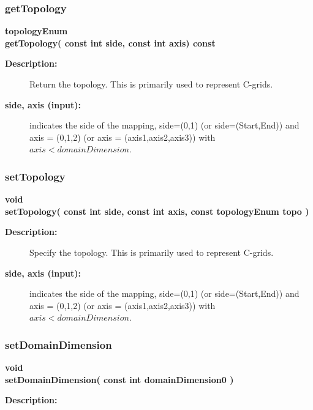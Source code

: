 \subsubsection{getTopology}
 
\begin{flushleft} \textbf{%
topologyEnum  \\ 
\settowidth{\MappingIncludeArgIndent}{getTopology(}%
getTopology( const int side, const int axis) const
}\end{flushleft}
\begin{description}
\item[{\bf Description:}] 
     Return the topology. This is primarily used to represent C-grids.
\item[{\bf side, axis (input):}]  indicates the side of the mapping, side=(0,1) (or side=(Start,End)) 
     and axis = (0,1,2) (or axis = (axis1,axis2,axis3)) with $axis<domainDimension$.
\end{description}
\subsubsection{setTopology}
 
\begin{flushleft} \textbf{%
void  \\ 
\settowidth{\MappingIncludeArgIndent}{setTopology(}%
setTopology( const int side, const int axis, const topologyEnum topo )
}\end{flushleft}
\begin{description}
\item[{\bf Description:}] 
 Specify the topology. This is primarily used to represent C-grids.
\item[{\bf side, axis (input):}]  indicates the side of the mapping, side=(0,1) (or side=(Start,End)) 
     and axis = (0,1,2) (or axis = (axis1,axis2,axis3)) with $axis<domainDimension$.
\end{description}
\subsubsection{setDomainDimension}
 
\begin{flushleft} \textbf{%
void  \\ 
\settowidth{\MappingIncludeArgIndent}{setDomainDimension(}%
setDomainDimension( const int domainDimension0 )
}\end{flushleft}
\begin{description}
\item[{\bf Description:}] 
\end{description}
